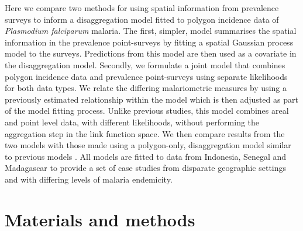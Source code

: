\documentclass{statsoc}
\begin{document}





Here we compare two methods for using spatial information from prevalence surveys to inform a disaggregation model fitted to polygon incidence data of \emph{Plasmodium falciparum}  malaria.
The first, simpler, model summarises the spatial information in the prevalence point-surveys by fitting a spatial Gaussian process model to the surveys.
Predictions from this model are then used as a covariate in the disaggregation model.
Secondly, we formulate a joint model that combines polygon incidence data and prevalence point-surveys using separate likelihoods for both data types.
We relate the differing malariometric measures by using a previously estimated relationship within the model \citep{cameron2015defining} which is then adjusted as part of the model fitting process.
Unlike previous studies, this model combines areal and point level data, with different likelihoods, without performing the aggregation step in the link function space.
We then compare results from the two models with those made using a polygon-only, disaggregation model similar to previous models \citep{sturrock2014fine, wilson2017pointless}.
All models are fitted to data from Indonesia, Senegal and Madagascar to provide a set of case studies from disparate geographic settings and with differing levels of malaria endemicity.







\section*{Materials and methods}
\end{document}
